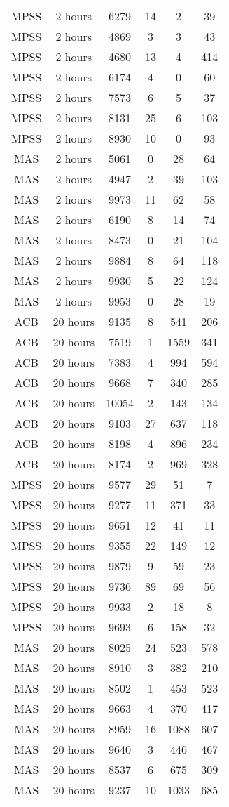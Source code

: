 \begin{center}
\begin{longtable}{cccccc}
MPSS	&	2 hours	&	6279	&	14	&	2	&	39	\\
MPSS	&	2 hours	&	4869	&	3	&	3	&	43	\\
MPSS	&	2 hours	&	4680	&	13	&	4	&	414	\\
MPSS	&	2 hours	&	6174	&	4	&	0	&	60	\\
MPSS	&	2 hours	&	7573	&	6	&	5	&	37	\\
MPSS	&	2 hours	&	8131	&	25	&	6	&	103	\\
MPSS	&	2 hours	&	8930	&	10	&	0	&	93	\\
MAS	&	2 hours	&	5061	&	0	&	28	&	64	\\
MAS	&	2 hours	&	4947	&	2	&	39	&	103	\\
MAS	&	2 hours	&	9973	&	11	&	62	&	58	\\
MAS	&	2 hours	&	6190	&	8	&	14	&	74	\\
MAS	&	2 hours	&	8473	&	0	&	21	&	104	\\
MAS	&	2 hours	&	9884	&	8	&	64	&	118	\\
MAS	&	2 hours	&	9930	&	5	&	22	&	124	\\
MAS	&	2 hours	&	9953	&	0	&	28	&	19	\\
ACB	&	20 hours	&	9135	&	8	&	541	&	206	\\
ACB	&	20 hours	&	7519	&	1	&	1559	&	341	\\
ACB	&	20 hours	&	7383	&	4	&	994	&	594	\\
ACB	&	20 hours	&	9668	&	7	&	340	&	285	\\
ACB	&	20 hours	&	10054	&	2	&	143	&	134	\\
ACB	&	20 hours	&	9103	&	27	&	637	&	118	\\
ACB	&	20 hours	&	8198	&	4	&	896	&	234	\\
ACB	&	20 hours	&	8174	&	2	&	969	&	328	\\
MPSS	&	20 hours	&	9577	&	29	&	51	&	7	\\
MPSS	&	20 hours	&	9277	&	11	&	371	&	33	\\
MPSS	&	20 hours	&	9651	&	12	&	41	&	11	\\
MPSS	&	20 hours	&	9355	&	22	&	149	&	12	\\
MPSS	&	20 hours	&	9879	&	9	&	59	&	23	\\
MPSS	&	20 hours	&	9736	&	89	&	69	&	56	\\
MPSS	&	20 hours	&	9933	&	2	&	18	&	8	\\
MPSS	&	20 hours	&	9693	&	6	&	158	&	32	\\
MAS	&	20 hours	&	8025	&	24	&	523	&	578	\\
MAS	&	20 hours	&	8910	&	3	&	382	&	210	\\
MAS	&	20 hours	&	8502	&	1	&	453	&	523	\\
MAS	&	20 hours	&	9663	&	4	&	370	&	417	\\
MAS	&	20 hours	&	8959	&	16	&	1088	&	607	\\
MAS	&	20 hours	&	9640	&	3	&	446	&	467	\\
MAS	&	20 hours	&	8537	&	6	&	675	&	309	\\
MAS	&	20 hours	&	9237	&	10	&	1033	&	685	\\

\end{longtable}    
\end{center} \newpage


